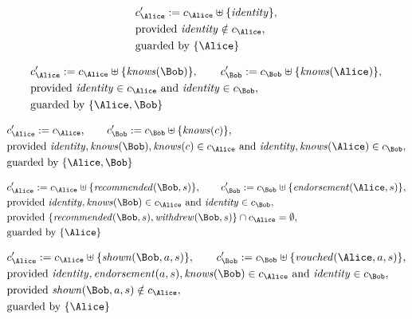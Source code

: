 \begin{align*}
&
c'_
{
\Alice
}
 := 
c_
{
\Alice
}
 \uplus 
\{
\mathit{
identity
}
\}
,\\
&
\text{provided } 
\mathit{
identity
}
 \notin c_
{
\Alice
}
,\\
&
\text{guarded by } \{
\Alice
\}
\end{align*}

\begin{align*}
&
c'_
{
\Alice
}
 := 
c_
{
\Alice
}
 \uplus 
\{
\mathit{
knows
}
(
\Bob
)
\}
, \qquad 
c'_
{
\Bob
}
 := 
c_
{
\Bob
}
 \uplus 
\{
\mathit{
knows
}
(
\Alice
)
\}
,\\
&
\text{provided } 
\mathit{
identity
}
 \in c_
{
\Alice
}
 \text{ and } 
\mathit{
identity
}
 \in c_
{
\Bob
}
,\\
&
\text{guarded by } \{
\Alice
,
\Bob
\}
\end{align*}

\begin{align*}
&
c'_
{
\Alice
}
 := 
c_
{
\Alice
}
, \qquad 
c'_
{
\Bob
}
 := 
c_
{
\Bob
}
 \uplus 
\{
\mathit{
knows
}
(
c
)
\}
,\\
&
\text{provided } 
\mathit{
identity
}
,
\mathit{
knows
}
(
\Bob
)
,
\mathit{
knows
}
(
c
)
 \in c_
{
\Alice
}
 \text{ and } 
\mathit{
identity
}
,
\mathit{
knows
}
(
\Alice
)
 \in c_
{
\Bob
}
,\\
&
\text{guarded by } \{
\Alice
,
\Bob
\}
\end{align*}

\begin{align*}
&
c'_
{
\Alice
}
 := 
c_
{
\Alice
}
 \uplus 
\{
\mathit{
recommended
}
(
\Bob
,
s
)
\}
, \qquad 
c'_
{
\Bob
}
 := 
c_
{
\Bob
}
 \uplus 
\{
\mathit{
endorsement
}
(
\Alice
,
s
)
\}
,\\
&
\text{provided } 
\mathit{
identity
}
,
\mathit{
knows
}
(
\Bob
)
 \in c_
{
\Alice
}
 \text{ and } 
\mathit{
identity
}
 \in c_
{
\Bob
}
,\\
&
\text{provided } 
\{
\mathit{
recommended
}
(
\Bob
,
s
)
,
\mathit{
withdrew
}
(
\Bob
,
s
)
\}
 \cap c_
{
\Alice
}
 = \emptyset
,\\
&
\text{guarded by } \{
\Alice
\}
\end{align*}

\begin{align*}
&
c'_
{
\Alice
}
 := 
c_
{
\Alice
}
 \uplus 
\{
\mathit{
shown
}
(
\Bob
,
a
,
s
)
\}
, \qquad 
c'_
{
\Bob
}
 := 
c_
{
\Bob
}
 \uplus 
\{
\mathit{
vouched
}
(
\Alice
,
a
,
s
)
\}
,\\
&
\text{provided } 
\mathit{
identity
}
,
\mathit{
endorsement
}
(
a
,
s
)
,
\mathit{
knows
}
(
\Bob
)
 \in c_
{
\Alice
}
 \text{ and } 
\mathit{
identity
}
 \in c_
{
\Bob
}
,\\
&
\text{provided } 
\mathit{
shown
}
(
\Bob
,
a
,
s
)
 \notin c_
{
\Alice
}
,\\
&
\text{guarded by } \{
\Alice
\}
\end{align*}
